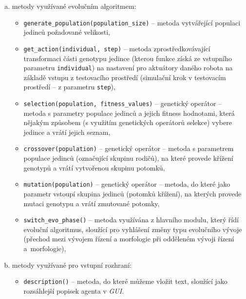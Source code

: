 \begin{enumerate}[a)]
    \item metody využívané evolučním algoritmem:
        \begin{itemize}
            \item \texttt{generate\_population(population\_size)} -- metoda
                vytvářející populaci jedinců požadované velikosti,
            \item \texttt{get\_action(individual, step)} -- metoda
                zprostředkovávající transformaci části genotypu jedince
                (kterou funkce získá ze vstupního parametru \texttt{individual}) na
                nastavení pro aktuátory daného robota na základě vstupu z
                testovacího prostředí (simulační krok v testovacím prostředí --
                z parametru \texttt{step}),
            \item \texttt{selection(population, fitness\_values)} -- genetický
                operátor -- metoda s parametry populace jedinců a jejich
                fitness hodnotami, která nějakým způsobem (s využitím
                genetických operátorů selekce) vybere jedince a vrátí jejich
                seznam,
            \item \texttt{crossover(population)} -- genetický operátor --
                metoda s parametrem populace jedinců (označující skupinu
                rodičů), na které provede křížení genotypů a vrátí vytvořenou
                skupinu potomků,
            \item \texttt{mutation(population)} -- genetický operátor --
                metoda, do které jako parametr vstoupí skupina jedinců (potomků
                křížení), na kterých provede mutaci genotypu a vrátí zmutované
                potomky,
            \item \texttt{switch\_evo\_phase()} -- metoda využívána z hlavního
                modulu, který řídí evoluční algoritmus, sloužící pro vyhlášení
                změny typu evolučního vývoje (přechod mezi vývojem řízení a
                morfologie při odděleném vývoji řízení a~morfologie),
        \end{itemize}
    \item metody využívané pro vstupní rozhraní:
        \begin{itemize}
            \item \texttt{description()} -- metoda, do které můžeme vložit
                text, sloužící jako rozsáhlejší popisek agenta v \emph{GUI}.
        \end{itemize}
\end{enumerate}

